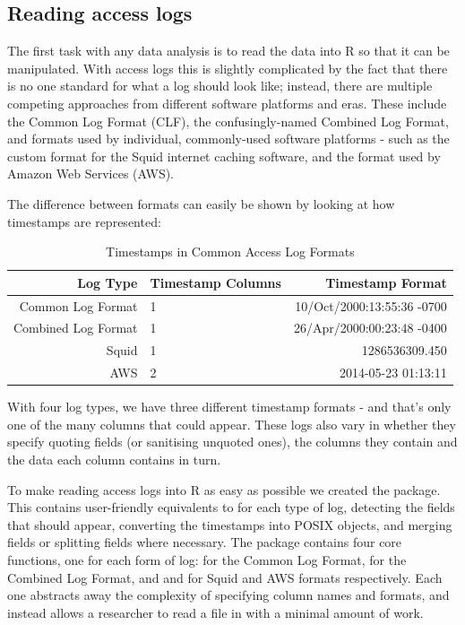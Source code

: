 \subsection{Reading access logs}\label{reading-access-logs}

The first task with any data analysis is to read the data into R so that
it can be manipulated. With access logs this is slightly complicated by
the fact that there is no one standard for what a log should look like;
instead, there are multiple competing approaches from different software
platforms and eras. These include the Common Log Format (CLF), the
confusingly-named Combined Log Format, and formats used by individual,
commonly-used software platforms - such as the custom format for the
Squid internet caching software, and the format used by Amazon Web
Services (AWS).

The difference between formats can easily be shown by looking at how
timestamps are represented:

\begin{table}[ht]
\centering
\caption{Timestamps in Common Access Log Formats}
\begin{tabular}{rlr}
  \hline
Log Type & Timestamp Columns & Timestamp Format \\ 
  \hline
Common Log Format & 1 & 10/Oct/2000:13:55:36 -0700\\ 
Combined Log Format & 1 & 26/Apr/2000:00:23:48 -0400\\ 
Squid & 1 & 1286536309.450\\ 
AWS & 2 & 2014-05-23    01:13:11\\ 
   \hline
\end{tabular}
\end{table}

With four log types, we have three different timestamp formats - and
that's only one of the many columns that could appear. These logs also
vary in whether they specify quoting fields (or sanitising unquoted
ones), the columns they contain and the data each column contains in
turn.

To make reading access logs into R as easy as possible we created the
 package. This contains user-friendly equivalents to
 for each type of log, detecting the fields that should
appear, converting the timestamps into POSIX objects, and merging fields
or splitting fields where necessary. The package contains four core
functions, one for each form of log:  for the Common Log
Format,  for the Combined Log Format, and
 and  for Squid and AWS formats
respectively. Each one abstracts away the complexity of specifying
column names and formats, and instead allows a researcher to read a file
in with a minimal amount of work.

